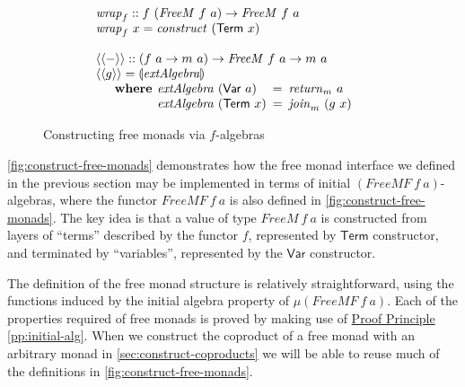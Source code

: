 \documentclass{jfp1}
\newcommand{\fold}[1]{\llparenthesis #1 \rrparenthesis}
\newcommand{\fmext}[1]{\langle\langle #1 \rangle\rangle}
\newcommand{\proofprinref}[1]{\hyperref[#1]{Proof Principle \ref*{#1}}}
\newcommand{\kw}[1]{\textbf{#1}}
\begin{document}
\begin{figure}
\begin{displaymath}
\begin{array}{@{}l}
      \\
      \begin{array}{@{}l}
        \mathit{wrap}_f :: f~(\mathit{FreeM}~f~a) \to \mathit{FreeM}~f~a \\
        \mathit{wrap}_f~x = \mathit{construct}~(\mathsf{Term}~x)
      \end{array} \\
      \\
      \begin{array}{@{}l}
        \fmext{-} :: (f~a \to m~a) \to \mathit{FreeM}~f~a \to m~a \\
        \fmext{g} = \fold{\mathit{extAlgebra}} \\
        \quad\begin{array}{r@{\hspace{0.4em}}l@{\hspace{0.5em}}c@{\hspace{0.5em}}l}
          \kw{where} & \mathit{extAlgebra}~(\mathsf{Var}~a) &=& \mathit{return}_m~a \\
          & \mathit{extAlgebra}~(\mathsf{Term}~x) &=& \mathit{join}_m~(g~x)
        \end{array}
      \end{array}
    \end{array}
  \end{displaymath}
  
  \caption{Constructing free monads via $f$-algebras}
\label{fig:construct-free-monads}
\end{figure}

\autoref{fig:construct-free-monads} demonstrates how the free monad
interface we defined in the previous section may be implemented in
terms of initial $(\mathit{FreeMF}~f~a)$-algebras, where the functor
$\mathit{FreeMF}~f~a$ is also defined in
\autoref{fig:construct-free-monads}. The key idea is that a value of
type $\mathit{FreeM}~f~a$ is constructed from layers of ``terms''
described by the functor $f$, represented by $\mathsf{Term}$
constructor, and terminated by ``variables'', represented by the
$\mathsf{Var}$ constructor.

The definition of the free monad structure is relatively
straightforward, using the functions induced by the initial algebra
property of $\mu (\mathit{FreeMF}~f~a)$. Each of the properties
required of free monads is proved by making use of
\proofprinref{pp:initial-alg}. When we construct the coproduct of a
free monad with an arbitrary monad in
\autoref{sec:construct-coproducts} we will be able to reuse much of
the definitions in \autoref{fig:construct-free-monads}.
\end{document}
